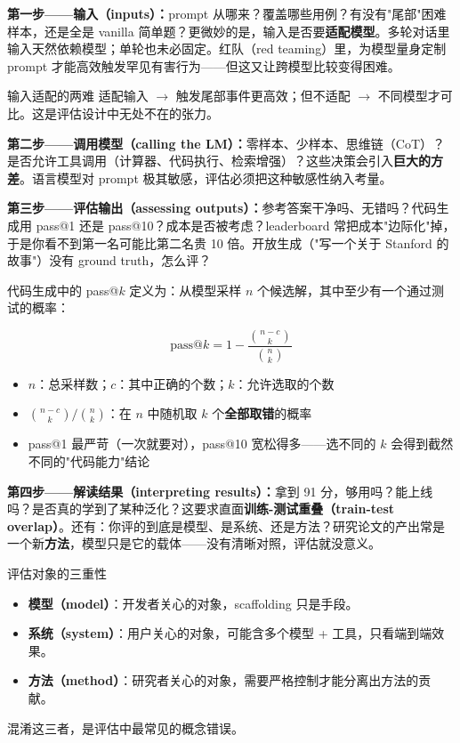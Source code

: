 \documentclass[a4paper]{article}
\begin{document}
\textbf{第一步——输入（inputs）：}prompt 从哪来？覆盖哪些用例？有没有"尾部"困难样本，还是全是 vanilla 简单题？更微妙的是，输入是否要\textbf{适配模型}。多轮对话里输入天然依赖模型；单轮也未必固定。红队（red teaming）里，为模型量身定制 prompt 才能高效触发罕见有害行为——但这又让跨模型比较变得困难。

\begin{knowledgebox}{输入适配的两难}
适配输入 $\to$ 触发尾部事件更高效；但不适配 $\to$ 不同模型才可比。这是评估设计中无处不在的张力。
\end{knowledgebox}

\textbf{第二步——调用模型（calling the LM）：}零样本、少样本、思维链（CoT）？是否允许工具调用（计算器、代码执行、检索增强）？这些决策会引入\textbf{巨大的方差}。语言模型对 prompt 极其敏感，评估必须把这种敏感性纳入考量。

\textbf{第三步——评估输出（assessing outputs）：}参考答案干净吗、无错吗？代码生成用 pass@1 还是 pass@10？成本是否被考虑？leaderboard 常把成本"边际化"掉，于是你看不到第一名可能比第二名贵 10 倍。开放生成（"写一个关于 Stanford 的故事"）没有 ground truth，怎么评？

代码生成中的 pass@$k$ 定义为：从模型采样 $n$ 个候选解，其中至少有一个通过测试的概率：

\[
\text{pass@}k = 1 - \frac{\binom{n-c}{k}}{\binom{n}{k}}
\]

\begin{itemize}
\item $n$：总采样数；$c$：其中正确的个数；$k$：允许选取的个数
\item $\binom{n-c}{k}/\binom{n}{k}$：在 $n$ 中随机取 $k$ 个\textbf{全部取错}的概率
\item pass@1 最严苛（一次就要对），pass@10 宽松得多——选不同的 $k$ 会得到截然不同的"代码能力"结论
\end{itemize}

\textbf{第四步——解读结果（interpreting results）：}拿到 91 分，够用吗？能上线吗？是否真的学到了某种泛化？这要求直面\textbf{训练-测试重叠（train-test overlap）}。还有：你评的到底是模型、是系统、还是方法？研究论文的产出常是一个新\textbf{方法}，模型只是它的载体——没有清晰对照，评估就没意义。

\begin{importantbox}{评估对象的三重性}
\begin{itemize}
\item \textbf{模型（model）}：开发者关心的对象，scaffolding 只是手段。
\item \textbf{系统（system）}：用户关心的对象，可能含多个模型 + 工具，只看端到端效果。
\item \textbf{方法（method）}：研究者关心的对象，需要严格控制才能分离出方法的贡献。
\end{itemize}
混淆这三者，是评估中最常见的概念错误。
\end{importantbox}
\end{document}
